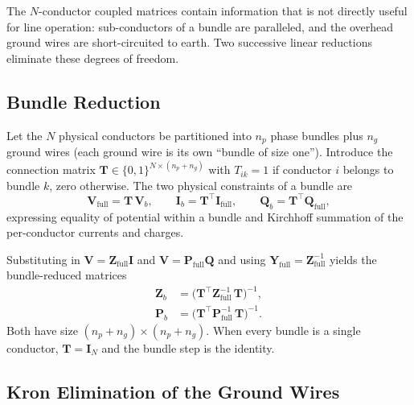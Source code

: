 \documentclass[11pt,a4paper]{article}
\newcommand{\matZ}{\bm{Z}}
\newcommand{\matY}{\bm{Y}}
\newcommand{\matP}{\bm{P}}
\newcommand{\matT}{\bm{T}}
\newcommand{\matI}{\bm{I}}
\newcommand{\vV}{\bm{V}}
\newcommand{\vI}{\bm{I}}
\newcommand{\vQ}{\bm{Q}}
\begin{document}
The \(N\)-conductor coupled matrices contain information that is not directly
useful for line operation: sub-conductors of a bundle are paralleled, and the
overhead ground wires are short-circuited to earth. Two successive linear
reductions eliminate these degrees of freedom.

\subsection{Bundle Reduction}

Let the \(N\) physical conductors be partitioned into \(n_p\) phase bundles
plus \(n_g\) ground wires (each ground wire is its own ``bundle of size one'').
Introduce the connection matrix \(\matT\in\{0,1\}^{N\times(n_{p}+n_{g})}\)
with \(T_{ik}=1\) if conductor \(i\) belongs to bundle \(k\), zero otherwise.
The two physical constraints of a bundle are
\begin{equation}
\vV_{\mathrm{full}}=\matT\,\vV_{b},\qquad
\vI_{b}=\matT^{\top}\vI_{\mathrm{full}},\qquad
\vQ_{b}=\matT^{\top}\vQ_{\mathrm{full}},
\label{eq:bundle-T}
\end{equation}
expressing equality of potential within a bundle and Kirchhoff summation of
the per-conductor currents and charges.

Substituting in \(\vV=\matZ_{\mathrm{full}}\vI\) and
\(\vV=\matP_{\mathrm{full}}\vQ\) and using
\(\matY_{\mathrm{full}}=\matZ_{\mathrm{full}}^{-1}\) yields the bundle-reduced
matrices
\begin{align}
\matZ_{b} &= \bigl(\matT^{\top}\matZ_{\mathrm{full}}^{-1}\,\matT\bigr)^{-1},
\label{eq:bundle-Z}\\[3pt]
\matP_{b} &= \bigl(\matT^{\top}\matP_{\mathrm{full}}^{-1}\,\matT\bigr)^{-1}.
\label{eq:bundle-P}
\end{align}
Both have size \((n_{p}+n_{g})\times(n_{p}+n_{g})\). When every bundle is a
single conductor, \(\matT=\matI_{N}\) and the bundle step is the identity.

\subsection{Kron Elimination of the Ground Wires}
\end{document}
